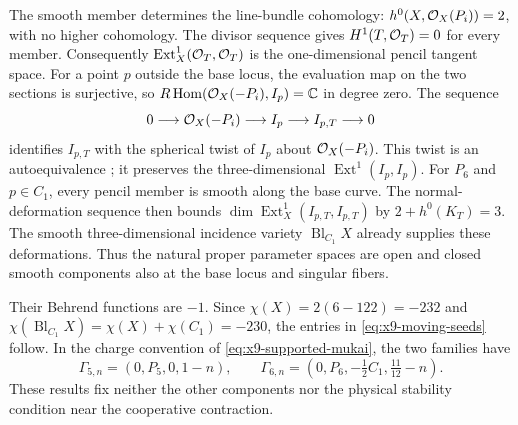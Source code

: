 The smooth member determines the line-bundle cohomology:
$h^0(X,\mathcal O_X(P_i))=2$, with no higher cohomology.
The divisor sequence gives $H^1(T,\mathcal O_T)=0$ for every member. Consequently
$\operatorname{Ext}^1_X(\mathcal O_T,\mathcal O_T)$ is the one-dimensional pencil
tangent space. For a point $p$ outside the base locus, the evaluation
map on the two sections is surjective, so
$R\operatorname{Hom}(\mathcal O_X(-P_i),I_p)=\mathbb C$ in degree zero.
The sequence
\begin{equation}
 0\longrightarrow\mathcal O_X(-P_i)\longrightarrow I_p
 \longrightarrow I_{p,T}\longrightarrow0
 \label{eq:x9-probe-twist}
\end{equation}
identifies $I_{p,T}$ with the spherical twist of $I_p$ about
$\mathcal O_X(-P_i)$. This twist is an autoequivalence
\cite[Theorem~1.2]{Seidel:2001Twists}; it preserves the
three-dimensional $\operatorname{Ext}^1(I_p,I_p)$.
For $P_6$ and $p\in C_1$, every pencil member is smooth along the
base curve. The normal-deformation sequence then bounds
$\dim\operatorname{Ext}^1_X(I_{p,T},I_{p,T})$ by
$2+h^0(K_T)=3$. The smooth three-dimensional incidence variety
$\operatorname{Bl}_{C_1}X$ already supplies these deformations.
Thus the natural proper parameter spaces are open and closed smooth
components also at the base locus and singular fibers.

Their Behrend functions are $-1$. Since
$\chi(X)=2(6-122)=-232$ and
$\chi(\operatorname{Bl}_{C_1}X)=\chi(X)+\chi(C_1)=-230$,
the entries in \eqref{eq:x9-moving-seeds} follow.
In the charge convention of \eqref{eq:x9-supported-mukai}, the two
families have
\begin{equation}
 \Gamma_{5,n}=(0,P_5,0,1-n),\qquad
 \Gamma_{6,n}=(0,P_6,-\tfrac12 C_1,\tfrac{11}{12}-n).
 \label{eq:x9-points-seed-charges}
\end{equation}
These results fix neither the other components nor the physical
stability condition near the cooperative contraction.
